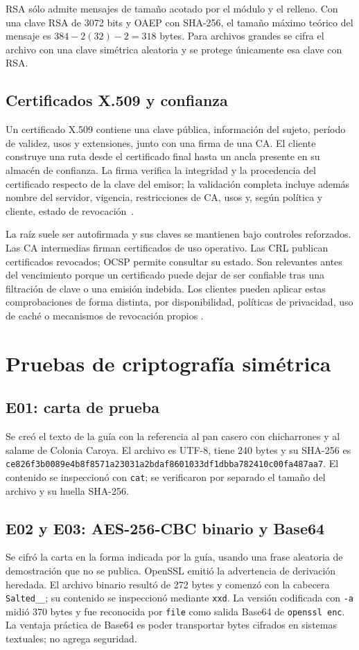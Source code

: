 \documentclass[11pt,a4paper]{article}
\begin{document}
RSA sólo admite mensajes de tamaño acotado por el módulo y el relleno. Con una
clave RSA de 3072 bits y OAEP con SHA-256, el tamaño máximo teórico del mensaje
es \(384-2(32)-2=318\) bytes. Para archivos grandes se cifra el archivo con
una clave simétrica aleatoria y se protege únicamente esa clave con RSA.

\subsection{Certificados X.509 y confianza}
Un certificado X.509 contiene una clave pública, información del sujeto,
período de validez, usos y extensiones, junto con una firma de una CA. El
cliente construye una ruta desde el certificado final hasta un ancla presente
en su almacén de confianza. La firma verifica la integridad y la procedencia
del certificado respecto de la clave del emisor; la validación completa
incluye además nombre del servidor, vigencia, restricciones de CA, usos y,
según política y cliente, estado de revocación~\cite{rfc5280}.

La raíz suele ser autofirmada y sus claves se mantienen bajo controles
reforzados. Las CA intermedias firman certificados de uso operativo. Las CRL
publican certificados revocados; OCSP permite consultar su estado. Son
relevantes antes del vencimiento porque un certificado puede dejar de ser
confiable tras una filtración de clave o una emisión indebida. Los clientes
pueden aplicar estas comprobaciones de forma distinta, por disponibilidad,
políticas de privacidad, uso de caché o mecanismos de revocación propios
\cite{rfc5280,rfc6960}.

\section{Pruebas de criptografía simétrica}
\subsection{E01: carta de prueba}
Se creó el texto de la guía con la referencia al pan casero con chicharrones y
al salame de Colonia Caroya. El archivo es UTF-8, tiene 240 bytes y su
SHA-256 es \texttt{ce826f3b0089e4b8\allowbreak f8571a23031a2bda\allowbreak f8601033df1dbba7\allowbreak 82410c00fa487aa7}.
El contenido se inspeccionó con \texttt{cat}; se verificaron por separado el
tamaño del archivo y su huella SHA-256.

\subsection{E02 y E03: AES-256-CBC binario y Base64}
Se cifró la carta en la forma indicada por la guía, usando una frase aleatoria
de demostración que no se publica. OpenSSL emitió la advertencia de derivación
heredada. El archivo binario resultó de 272 bytes y comenzó con la cabecera
\texttt{Salted\_\_}; su contenido se inspeccionó mediante \texttt{xxd}. La
versión codificada con \texttt{-a} midió 370 bytes y fue reconocida por
\texttt{file} como salida Base64 de \texttt{openssl enc}. La ventaja práctica
de Base64 es poder transportar bytes cifrados en sistemas textuales; no agrega
seguridad.
\end{document}
